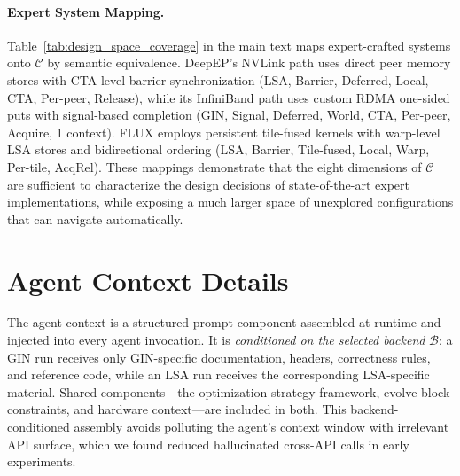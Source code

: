 \paragraph{Expert System Mapping.}
Table~\ref{tab:design_space_coverage} in the main text maps expert-crafted systems onto $\mathcal{C}$ by semantic equivalence. DeepEP's NVLink path uses direct peer memory stores with CTA-level barrier synchronization (LSA, Barrier, Deferred, Local, CTA, Per-peer, Release), while its InfiniBand path uses custom RDMA one-sided puts with signal-based completion (GIN, Signal, Deferred, World, CTA, Per-peer, Acquire, 1 context). FLUX employs persistent tile-fused kernels with warp-level LSA stores and bidirectional ordering (LSA, Barrier, Tile-fused, Local, Warp, Per-tile, AcqRel). These mappings demonstrate that the eight dimensions of $\mathcal{C}$ are sufficient to characterize the design decisions of state-of-the-art expert implementations, while exposing a much larger space of unexplored configurations that \cufuse{} can navigate automatically.


\section{Agent Context Details}\label{sec:agent_context}

The agent context is a structured prompt component assembled at runtime and injected into every agent invocation. It is \emph{conditioned on the selected backend} $\mathcal{B}$: a GIN run receives only GIN-specific documentation, headers, correctness rules, and reference code, while an LSA run receives the corresponding LSA-specific material. Shared components---the optimization strategy framework, evolve-block constraints, and hardware context---are included in both. This backend-conditioned assembly avoids polluting the agent's context window with irrelevant API surface, which we found reduced hallucinated cross-API calls in early experiments.

